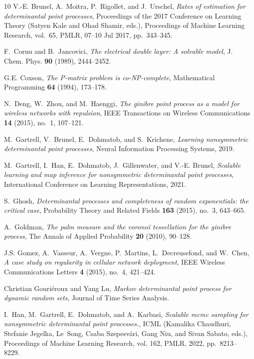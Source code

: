 \documentclass{article}
\numberwithin{equation}{section}
\theoremstyle{plain}
\begin{document}
\begin{thebibliography}{10}
V.-E. Brunel, A.~Moitra, P.~Rigollet, and J.~Urschel, \emph{Rates of estimation
  for determinantal point processes}, Proceedings of the 2017 Conference on
  Learning Theory (Satyen Kale and Ohad Shamir, eds.), Proceedings of Machine
  Learning Research, vol.~65, PMLR, 07--10 Jul 2017, pp.~343--345.

F.~Cornu and B.~Jancovici, \emph{The electrical double layer: A solvable
  model}, J. Chem. Phys. \textbf{90} (1989), 2444–2452.

G.E. Coxson, \emph{The {P}-matrix problem is co-{NP}-complete}, Mathematical
  Programming \textbf{64} (1994), 173--178.

N.~Deng, W.~Zhou, and M.~Haenggi, \emph{The ginibre point process as a model
  for wireless networks with repulsion}, IEEE Transactions on Wireless
  Communications \textbf{14} (2015), no.~1, 107--121.

M.~Gartrell, V.~Brunel, E.~Dohmatob, and S.~Krichene, \emph{Learning
  nonsymmetric determinantal point processes}, Neural Information Processing
  Systems, 2019.

M.~Gartrell, I.~Han, E.~Dohmatob, J.~Gillenwater, and V.-E. Brunel,
  \emph{Scalable learning and map inference for nonsymmetric determinantal
  point processes}, International Conference on Learning Representations, 2021.

S.~Ghosh, \emph{{Determinantal processes and completeness of random
  exponentials: the critical case}}, Probability Theory and Related Fields
  \textbf{163} (2015), no.~3, 643--665.

A.~Goldman, \emph{The palm measure and the voronoï tessellation for the
  ginibre process}, The Annals of Applied Probability \textbf{20} (2010),
  90--128.

J.S. Gomez, A.~Vasseur, A.~Vergne, P.~Martins, L.~Decreusefond, and W.~Chen,
  \emph{A case study on regularity in cellular network deployment}, IEEE
  Wireless Communications Letters \textbf{4} (2015), no.~4, 421--424.

Christian Gouriéroux and Yang Lu, \emph{Markov determinantal point process for
  dynamic random sets}, Journal of Time Series Analysis.

I.~Han, M.~Gartrell, E.~Dohmatob, and A.~Karbasi, \emph{Scalable mcmc sampling
  for nonsymmetric determinantal point processes.}, ICML (Kamalika Chaudhuri,
  Stefanie Jegelka, Le~Song, Csaba Szepesvári, Gang Niu, and Sivan Sabato,
  eds.), Proceedings of Machine Learning Research, vol. 162, PMLR, 2022,
  pp.~8213--8229.


\end{thebibliography}
\end{document}
